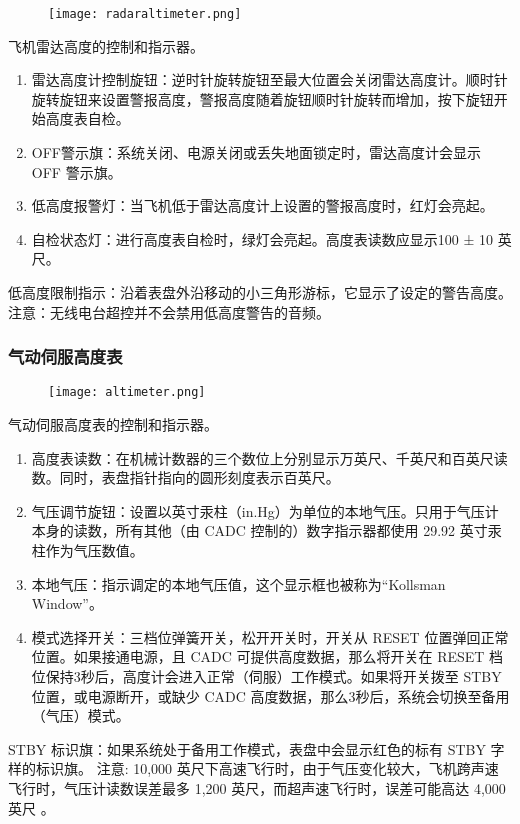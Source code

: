 \begin{figure}[htb]
	\centering
	\texttt{[image: radaraltimeter.png]}
\end{figure}
飞机雷达高度的控制和指示器。

\begin{enumerate}
	\item 雷达高度计控制旋钮：逆时针旋转旋钮至最大位置会关闭雷达高度计。顺时针旋转旋钮来设置警报高度，警报高度随着旋钮顺时针旋转而增加，按下旋钮开始高度表自检。
	\item OFF警示旗：系统关闭、电源关闭或丢失地面锁定时，雷达高度计会显示 OFF 警示旗。
	\item 低高度报警灯：当飞机低于雷达高度计上设置的警报高度时，红灯会亮起。
	\item 自检状态灯：进行高度表自检时，绿灯会亮起。高度表读数应显示100 ± 10 英尺。
\end{enumerate}

低高度限制指示：沿着表盘外沿移动的小三角形游标，它显示了设定的警告高度。
注意：无线电台超控并不会禁用低高度警告的音频。

\subsubsection{气动伺服高度表}

\begin{figure}[htb]
	\centering
	\texttt{[image: altimeter.png]}
\end{figure}
气动伺服高度表的控制和指示器。

\begin{enumerate}
	\item 高度表读数：在机械计数器的三个数位上分别显示万英尺、千英尺和百英尺读数。同时，表盘指针指向的圆形刻度表示百英尺。
	\item 气压调节旋钮：设置以英寸汞柱（in.Hg）为单位的本地气压。只用于气压计本身的读数，所有其他（由 CADC 控制的）数字指示器都使用 29.92 英寸汞柱作为气压数值。
	\item 本地气压：指示调定的本地气压值，这个显示框也被称为“Kollsman Window”。
	\item 模式选择开关：三档位弹簧开关，松开开关时，开关从 RESET 位置弹回正常位置。如果接通电源，且 CADC 可提供高度数据，那么将开关在 RESET 档位保持3秒后，高度计会进入正常（伺服）工作模式。如果将开关拨至 STBY 位置，或电源断开，或缺少 CADC 高度数据，那么3秒后，系统会切换至备用（气压）模式。
\end{enumerate}

STBY 标识旗：如果系统处于备用工作模式，表盘中会显示红色的标有 STBY 字样的标识旗。
注意:	10,000 英尺下高速飞行时，由于气压变化较大，飞机跨声速飞行时，气压计读数误差最多 1,200 英尺，而超声速飞行时，误差可能高达 4,000 英尺 。

